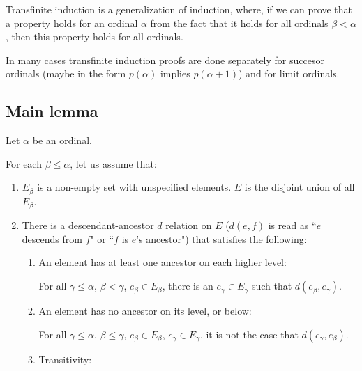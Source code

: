 \documentclass[a4paper
,draft
]{article}
\newcommand{\ghilimele}[1]{``#1"}
\begin{document}
Transfinite induction is a generalization of induction, where, if we can prove that a property holds for an ordinal $\alpha$ from the fact that it holds for all ordinals $\beta<\alpha$, then this property holds for all ordinals.

In many cases transfinite induction proofs are done separately for succesor ordinals (maybe in the form $p(\alpha)$ implies $p(\alpha+1)$) and for limit ordinals.

\subsection{Main lemma}

Let $\alpha$ be an ordinal.

For each $\beta\le\alpha$, let us assume that:
\begin{enumerate}
  \item $E_\beta$ is a non-empty set with unspecified elements.
        $E$ is the disjoint union of
        all $E_\beta$.
  \item There is a descendant-ancestor $d$ relation on $E$ ($d(e, f)$ is read as
        \ghilimele{$e$ descends from $f$} or \ghilimele{$f$ is $e$'s ancestor})
        that satisfies the following:
        \begin{enumerate}
          \item An element has at least one ancestor on each higher level:

                For all $\gamma\le\alpha$, $\beta<\gamma$,
                $e_\beta\in E_\beta$,
                there is an $e_\gamma\in E_\gamma$ such that
                $d(e_\beta, e_\gamma)$.
          \item An element has no ancestor on its level, or below:

                For all $\gamma\le\alpha$, $\beta\le\gamma$,
                $e_\beta\in E_\beta$,
                $e_\gamma\in E_\gamma$, it is not the case that
                $d(e_\gamma, e_\beta)$.
          \item Transitivity:


\end{enumerate}
\end{enumerate}
\end{document}
